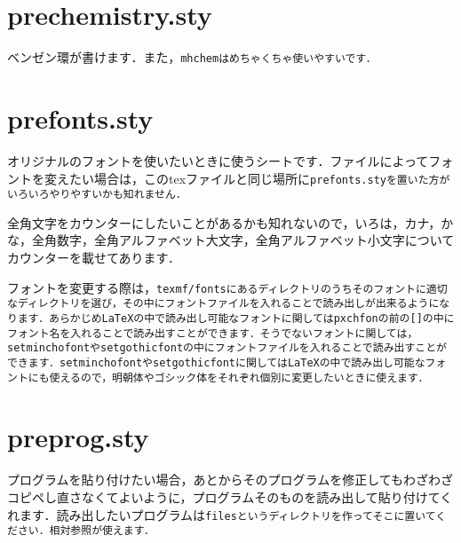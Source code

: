 \documentclass[a4paper, 9pt]{jsarticle}
\begin{document}
\section{prechemistry.sty}
ベンゼン環が書けます．また，\tt{mhchem}はめちゃくちゃ使いやすいです．\par 
{}

\section{prefonts.sty}
オリジナルのフォントを使いたいときに使うシートです．ファイルによってフォントを変えたい場合は，このtexファイルと同じ場所に\tt{prefonts.sty}を置いた方がいろいろやりやすいかも知れません．\par 
全角文字をカウンターにしたいことがあるかも知れないので，いろは，カナ，かな，全角数字，全角アルファベット大文字，全角アルファベット小文字についてカウンターを載せてあります．\par 
フォントを変更する際は，\tt{texmf/fonts}にあるディレクトリのうちそのフォントに適切なディレクトリを選び，その中にフォントファイルを入れることで読み出しが出来るようになります．あらかじめ\LaTeX の中で読み出し可能なフォントに関しては\tt{pxchfon}の前の[]の中にフォント名を入れることで読み出すことができます．そうでないフォントに関しては，\tt{setminchofont}や\tt{setgothicfont}の中にフォントファイルを入れることで読み出すことができます．\tt{setminchofont}や\tt{setgothicfont}に関しては\LaTeX の中で読み出し可能なフォントにも使えるので，明朝体やゴシック体をそれぞれ個別に変更したいときに使えます．

\section{preprog.sty}
プログラムを貼り付けたい場合，あとからそのプログラムを修正してもわざわざコピペし直さなくてよいように，プログラムそのものを読み出して貼り付けてくれます．読み出したいプログラムは\tt{files}というディレクトリを作ってそこに置いてください．相対参照が使えます．

\end{document}
